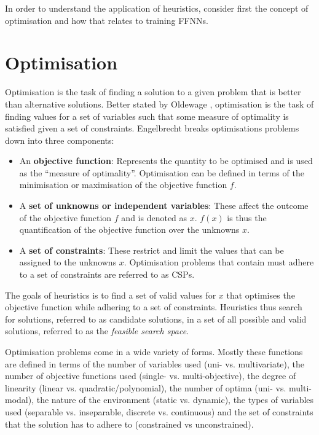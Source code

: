 In order to understand the application of heuristics, consider first the concept of optimisation and how that relates to training \acp{FFNN}.

\section{Optimisation}
\label{sec:heuristics:optimisation}

Optimisation is the task of finding a solution to a given problem that is better than alternative solutions. Better stated by Oldewage \cite{ref:oldewage:2017}, optimisation is the task of finding values for a set of variables such that some measure of optimality is satisfied given a set of constraints. Engelbrecht \cite{ref:engelbrecht:2007} breaks optimisations problems down into three components:

\begin{itemize}
  \item An \textbf{objective function}: Represents the quantity to be optimised and is used as the ``measure of optimality''. Optimisation can be defined in terms of the minimisation or maximisation of the objective function $f$. 
  
  \item A \textbf{set of unknowns or independent variables}: These affect the outcome of the objective function $f$ and is denoted as $x$. $f(x)$ is thus the quantification of the objective function over the unknowns $x$.
  
  \item A \textbf{set of constraints}: These restrict and limit the values that can be assigned to the unknowns $x$. Optimisation problems that contain must adhere to a set of constraints are referred to as \acp{CSP}.
\end{itemize}

The goals of heuristics is to find a set of valid values for $x$ that optimises the objective function while adhering to a set of constraints. Heuristics thus search for solutions, referred to as candidate solutions, in a set of all possible and valid solutions, referred to as the \textit{feasible search space}.

Optimisation problems come in a wide variety of forms. Mostly these functions are defined in terms of the number of variables used (uni- vs. multivariate), the number of objective functions used (single- vs. multi-objective), the degree of linearity (linear vs. quadratic/polynomial), the number of optima (uni- vs. multi-modal), the nature of the environment (static vs. dynamic), the types of variables used (separable vs. inseparable, discrete vs. continuous) and  the set of constraints that the solution has to adhere to (constrained vs unconstrained). 

